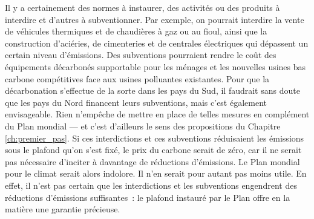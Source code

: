 \documentclass[a5paper,french,openany]{memoir}
\begin{document}
Il y a certainement des normes à instaurer, des activités ou des produits à interdire et d'autres à subventionner. Par exemple, on pourrait interdire la vente de véhicules thermiques et de chaudières à gaz ou au fioul, ainsi que la construction d'aciéries, de cimenteries et de centrales électriques qui dépassent un certain niveau d'émissions. Des subventions pourraient rendre le coût des équipements décarbonés supportable pour les ménages et les nouvelles usines bas carbone compétitives face aux usines polluantes existantes. Pour que la décarbonation s'effectue de la sorte dans les pays du Sud, il faudrait sans doute que les pays du Nord financent leurs subventions, mais c'est également envisageable. Rien n'empêche de mettre en place de telles mesures en complément du Plan mondial --- et c'est d'ailleurs le sens des propositions du Chapitre \ref{ch:premier_pas}. Si ces interdictions et ces subventions réduisaient les émissions sous le plafond qu'on s'est fixé, le prix du carbone serait de zéro, car il ne serait pas nécessaire d'inciter à davantage de réductions d'émissions. Le Plan mondial pour le climat serait alors indolore. Il n'en serait pour autant pas moins utile. En effet, il n'est pas certain que les interdictions et les subventions engendrent des réductions d'émissions suffisantes~: le plafond instauré par le Plan offre en la matière une garantie précieuse.
\end{document}
